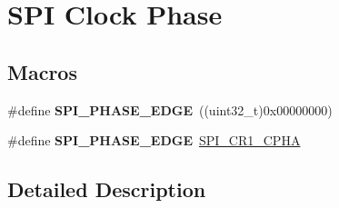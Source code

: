 \hypertarget{group___s_p_i___clock___phase}{}\section{S\+PI Clock Phase}
\label{group___s_p_i___clock___phase}
\subsection*{Macros}
\begin{DoxyCompactItemize}
\item 
\#define {\bfseries S\+P\+I\+\_\+\+P\+H\+A\+S\+E\+\_\+E\+D\+GE}~((uint32\+\_\+t)0x00000000)\hypertarget{group___s_p_i___clock___phase_ga208be78b79c51df200a495c4d2110b57}{}\label{group___s_p_i___clock___phase_ga208be78b79c51df200a495c4d2110b57}

\item 
\#define {\bfseries S\+P\+I\+\_\+\+P\+H\+A\+S\+E\+\_\+E\+D\+GE}~\hyperlink{group___peripheral___registers___bits___definition_ga97602d8ded14bbd2c1deadaf308755a3}{S\+P\+I\+\_\+\+C\+R1\+\_\+\+C\+P\+HA}\hypertarget{group___s_p_i___clock___phase_ga960275ac1d01d302c48e713399990c36}{}\label{group___s_p_i___clock___phase_ga960275ac1d01d302c48e713399990c36}

\end{DoxyCompactItemize}


\subsection{Detailed Description}
